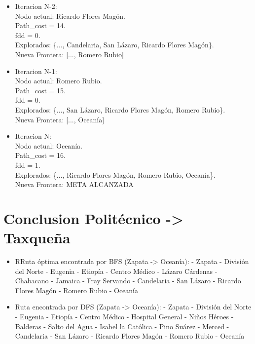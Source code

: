 \documentclass[10pt,a4paper]{article}
\begin{document}
\begin{itemize}
    \item Iteracion N-2:\\
    Nodo actual: Ricardo Flores Magón.\\
    Path\_cost = 14.\\
    fdd = 0.\\
    Explorados: \{..., Candelaria, San Lázaro, Ricardo Flores Magón\}.\\
    Nueva Frontera: [..., Romero Rubio]

    \item Iteracion N-1:\\
    Nodo actual: Romero Rubio.\\
    Path\_cost = 15.\\
    fdd = 0.\\
    Explorados: \{..., San Lázaro, Ricardo Flores Magón, Romero Rubio\}.\\
    Nueva Frontera: [..., Oceanía]

    \item Iteracion N:\\
    Nodo actual: Oceanía.\\
    Path\_cost = 16.\\
    fdd = 1.\\
    Explorados: \{..., Ricardo Flores Magón, Romero Rubio, Oceanía\}.\\
    Nueva Frontera: META ALCANZADA

\end{itemize}

\newpage
\section{Conclusion Politécnico -> Taxqueña}

\begin{itemize}
    \item RRuta óptima encontrada por BFS (Zapata -> Oceanía):
    - Zapata
    - División del Norte
    - Eugenia
    - Etiopía
    - Centro Médico
    - Lázaro Cárdenas
    - Chabacano
    - Jamaica
    - Fray Servando
    - Candelaria
    - San Lázaro
    - Ricardo Flores Magón
    - Romero Rubio
    - Oceanía

\item Ruta encontrada por DFS (Zapata -> Oceanía):
    - Zapata
    - División del Norte
    - Eugenia
    - Etiopía
    - Centro Médico
    - Hospital General
    - Niños Héroes
    - Balderas
    - Salto del Agua
    - Isabel la Católica
    - Pino Suárez
    - Merced
    - Candelaria
    - San Lázaro
    - Ricardo Flores Magón
    - Romero Rubio
    - Oceanía
\end{itemize}
\end{document}
